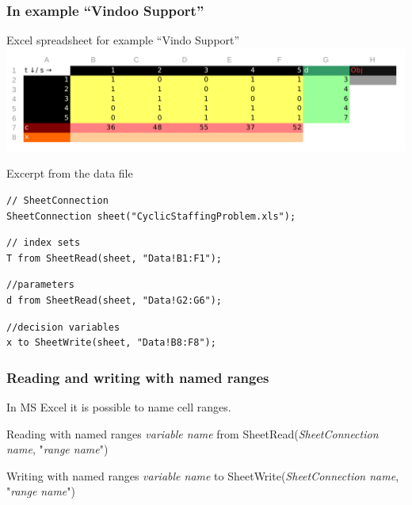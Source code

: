 \begin{frame}[fragile]
 \frametitle{In example ``Vindoo Support''}
 \begin{block}{Excel spreadsheet for example ``Vindo Support''}
  \centering
  \includegraphics[width=.9\linewidth]{Bilder/CyclicStaffingData}
 \end{block}
 \begin{block}{Excerpt from the data file}
\begin{lstlisting}[language=opldata,numbers=none,basicstyle=\ttfamily\scriptsize]
// SheetConnection
SheetConnection sheet("CyclicStaffingProblem.xls");
\end{lstlisting}\vspace{-2\baselineskip}
\begin{lstlisting}[language=opldata,numbers=none,basicstyle=\ttfamily\scriptsize]
// index sets
T from SheetRead(sheet, "Data!B1:F1");
\end{lstlisting}\vspace{-2\baselineskip}
\begin{lstlisting}[language=opldata,numbers=none,basicstyle=\ttfamily\scriptsize]
//parameters
d from SheetRead(sheet, "Data!G2:G6");
\end{lstlisting}\vspace{-2\baselineskip}
\begin{lstlisting}[language=opldata,numbers=none,basicstyle=\ttfamily\scriptsize]
//decision variables
x to SheetWrite(sheet, "Data!B8:F8");
\end{lstlisting}
 \end{block}
\end{frame}

\begin{frame}
 \frametitle{Reading and writing with named ranges}
 In MS Excel it is possible to name cell ranges.
 \begin{block}{Reading with named ranges}
  \ttfamily
  \textsf{\slshape variable name} from SheetRead(\textsf{\slshape SheetConnection name}, "\textsf{\slshape range name}")
 \end{block}
 \begin{block}{Writing with named ranges}
  \ttfamily
  \textsf{\slshape variable name} to SheetWrite(\textsf{\slshape SheetConnection name}, "\textsf{\slshape range name}")
 \end{block}
\end{frame}

